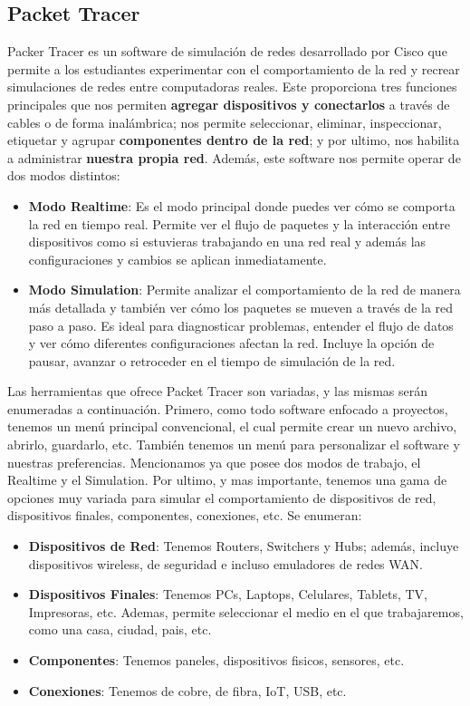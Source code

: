 \documentclass{article}
\begin{document}

\subsection{Packet Tracer}
Packer Tracer es un software de simulación de redes desarrollado por Cisco que permite a los estudiantes experimentar con el comportamiento de la red y recrear simulaciones de redes entre computadoras reales.
Este proporciona tres funciones principales que nos permiten \textbf{agregar dispositivos y conectarlos} a través de cables o de forma inalámbrica; nos permite seleccionar, eliminar, inspeccionar, etiquetar y agrupar \textbf{componentes dentro de la red}; y por ultimo, nos habilita a administrar \textbf{nuestra propia red}. Además, este software nos permite operar de dos modos distintos: 

\begin{itemize}
    \item \textbf{Modo Realtime}: Es el modo principal donde puedes ver cómo se comporta la red en tiempo real. Permite ver el flujo de paquetes y la interacción entre dispositivos como si estuvieras trabajando en una red real y además las configuraciones y cambios se aplican inmediatamente.
    \item \textbf{Modo Simulation}: Permite analizar el comportamiento de la red de manera más detallada y también ver cómo los paquetes se mueven a través de la red paso a paso. Es ideal para diagnosticar problemas, entender el flujo de datos y ver cómo diferentes configuraciones afectan la red. Incluye la opción de pausar, avanzar o retroceder en el tiempo de simulación de la red.
\end{itemize}

Las herramientas que ofrece Packet Tracer son variadas, y las mismas serán enumeradas a continuación. Primero, como todo software enfocado a proyectos, tenemos un menú principal convencional, el cual permite crear un nuevo archivo, abrirlo, guardarlo, etc. También tenemos un menú para personalizar el software y nuestras preferencias. Mencionamos ya que posee dos modos de trabajo, el Realtime y el Simulation. Por ultimo, y mas importante, tenemos una gama de opciones muy variada para simular el comportamiento de dispositivos de red, dispositivos finales, componentes, conexiones, etc. Se enumeran:

\begin{itemize}
    \item \textbf{Dispositivos de Red}: Tenemos Routers, Switchers y Hubs; además, incluye dispositivos wireless, de seguridad e incluso emuladores de redes WAN.
    \item \textbf{Dispositivos Finales}: Tenemos PCs, Laptops, Celulares, Tablets, TV, Impresoras, etc. Ademas, permite seleccionar el medio en el que trabajaremos, como una casa, ciudad, pais, etc. 
    \item \textbf{Componentes}: Tenemos paneles, dispositivos fisicos, sensores, etc. 
    \item \textbf{Conexiones}: Tenemos de cobre, de fibra, IoT, USB, etc.
\end{itemize}
\end{document}
